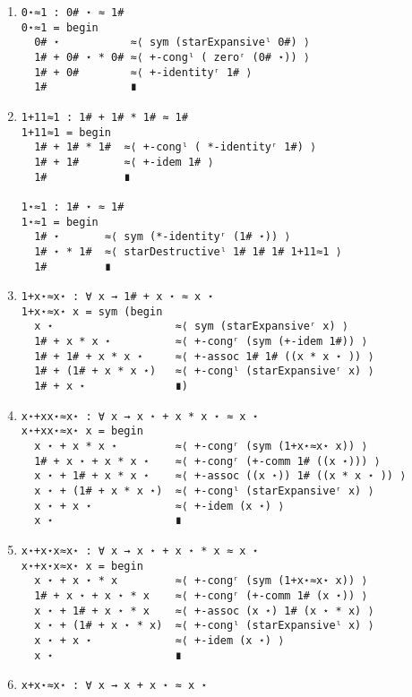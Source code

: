 \begin{enumerate}
\item
\begin{verbatim}
0⋆≈1 : 0# ⋆ ≈ 1#
0⋆≈1 = begin
  0# ⋆           ≈⟨ sym (starExpansiveˡ 0#) ⟩
  1# + 0# ⋆ * 0# ≈⟨ +-congˡ ( zeroʳ (0# ⋆)) ⟩
  1# + 0#        ≈⟨ +-identityʳ 1# ⟩
  1#             ∎
\end{verbatim}
\item
\begin{verbatim}
1+11≈1 : 1# + 1# * 1# ≈ 1#
1+11≈1 = begin
  1# + 1# * 1#  ≈⟨ +-congˡ ( *-identityʳ 1#) ⟩
  1# + 1#       ≈⟨ +-idem 1# ⟩
  1#            ∎

1⋆≈1 : 1# ⋆ ≈ 1#
1⋆≈1 = begin
  1# ⋆       ≈⟨ sym (*-identityʳ (1# ⋆)) ⟩
  1# ⋆ * 1#  ≈⟨ starDestructiveˡ 1# 1# 1# 1+11≈1 ⟩
  1#         ∎
\end{verbatim}
\item
\begin{verbatim}
1+x⋆≈x⋆ : ∀ x → 1# + x ⋆ ≈ x ⋆
1+x⋆≈x⋆ x = sym (begin
  x ⋆                   ≈⟨ sym (starExpansiveʳ x) ⟩
  1# + x * x ⋆          ≈⟨ +-congʳ (sym (+-idem 1#)) ⟩
  1# + 1# + x * x ⋆     ≈⟨ +-assoc 1# 1# ((x * x ⋆ )) ⟩
  1# + (1# + x * x ⋆)   ≈⟨ +-congˡ (starExpansiveʳ x) ⟩
  1# + x ⋆              ∎)
\end{verbatim}
\item
\begin{verbatim}
x⋆+xx⋆≈x⋆ : ∀ x → x ⋆ + x * x ⋆ ≈ x ⋆
x⋆+xx⋆≈x⋆ x = begin
  x ⋆ + x * x ⋆         ≈⟨ +-congʳ (sym (1+x⋆≈x⋆ x)) ⟩
  1# + x ⋆ + x * x ⋆    ≈⟨ +-congʳ (+-comm 1# ((x ⋆))) ⟩
  x ⋆ + 1# + x * x ⋆    ≈⟨ +-assoc ((x ⋆)) 1# ((x * x ⋆ )) ⟩
  x ⋆ + (1# + x * x ⋆)  ≈⟨ +-congˡ (starExpansiveʳ x) ⟩
  x ⋆ + x ⋆             ≈⟨ +-idem (x ⋆) ⟩
  x ⋆                   ∎
\end{verbatim}
\item
\begin{verbatim}
x⋆+x⋆x≈x⋆ : ∀ x → x ⋆ + x ⋆ * x ≈ x ⋆
x⋆+x⋆x≈x⋆ x = begin
  x ⋆ + x ⋆ * x         ≈⟨ +-congʳ (sym (1+x⋆≈x⋆ x)) ⟩
  1# + x ⋆ + x ⋆ * x    ≈⟨ +-congʳ (+-comm 1# (x ⋆)) ⟩
  x ⋆ + 1# + x ⋆ * x    ≈⟨ +-assoc (x ⋆) 1# (x ⋆ * x) ⟩
  x ⋆ + (1# + x ⋆ * x)  ≈⟨ +-congˡ (starExpansiveˡ x) ⟩
  x ⋆ + x ⋆             ≈⟨ +-idem (x ⋆) ⟩
  x ⋆                   ∎
\end{verbatim}
\item
\begin{verbatim}
x+x⋆≈x⋆ : ∀ x → x + x ⋆ ≈ x ⋆

\end{verbatim}
\end{enumerate}
